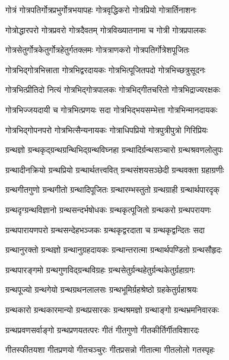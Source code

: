 \twolineshloka
{गोत्रं गोत्रपतिर्गोत्रप्रभुर्गोत्रभयापहः}%
{गोत्रवृद्धिकरो गोत्रप्रियो गोत्रार्तिनाशनः}%

\twolineshloka
{गोत्रोद्धारपरो गोत्रप्रवरो गोत्रदैवतम्}%
{गोत्रविख्यातनामा च गोत्री गोत्रप्रपालकः}%

\twolineshloka
{गोत्रसेतुर्गोत्रकेतुर्गोत्रहेतुर्गतक्लमः}%
{गोत्रत्राणकरो गोत्रपतिर्गोत्रेशपूजितः}%

\twolineshloka
{गोत्रभिद्गोत्रभित्त्राता गोत्रभिद्वरदायकः}%
{गोत्रभित्पूजितपदो गोत्रभिच्छत्रुसूदनः}%

\twolineshloka
{गोत्रभित्प्रीतिदो नित्यं गोत्रभिद्गोत्रपालकः}%
{गोत्रभिद्गीतचरितो गोत्रभिद्राज्यरक्षकः}%

\twolineshloka
{गोत्रभिज्जयदायी च गोत्रभित्प्रणयः सदा}%
{गोत्रभिद्भयसम्भेत्ता गोत्रभिन्मानदायकः}%

\twolineshloka
{गोत्रभिद्गोपनपरो गोत्रभित्सैन्यनायकः}%
{गोत्राधिपप्रियो गोत्रपुत्रीपुत्रो गिरिप्रियः}%

\twolineshloka
{ग्रन्थज्ञो ग्रन्थकृद्ग्रन्थग्रन्थिभिद्ग्रन्थविघ्नहा}%
{ग्रन्थादिर्ग्रन्थसञ्चारो ग्रन्थश्रवणलोलुपः}%

\twolineshloka
{ग्रन्थादीनक्रियो ग्रन्थप्रियो ग्रन्थार्थतत्त्ववित्}%
{ग्रन्थसंशयसञ्छेदी ग्रन्थवक्ता ग्रहाग्रणीः}%

\twolineshloka
{ग्रन्थगीतगुणो ग्रन्थगीतो ग्रन्थादिपूजितः}%
{ग्रन्थारम्भस्तुतो ग्रन्थग्राही ग्रन्थार्थपारदृक्}%

\twolineshloka
{ग्रन्थदृग्ग्रन्थविज्ञानो ग्रन्थसन्दर्भषोधकः}%
{ग्रन्थकृत्पूजितो ग्रन्थकरो ग्रन्थपरायणः}%

\twolineshloka
{ग्रन्थपारायणपरो ग्रन्थसन्देहभञ्जकः}%
{ग्रन्थकृद्वरदाता च ग्रन्थकृद्वन्दितः सदा}%

\twolineshloka
{ग्रन्थानुरक्तो ग्रन्थज्ञो ग्रन्थानुग्रहदायकः}%
{ग्रन्थान्तरात्मा ग्रन्थार्थपण्डितो ग्रन्थसौहृदः}%

\twolineshloka
{ग्रन्थपारङ्गमो ग्रन्थगुणविद्ग्रन्थविग्रहः}%
{ग्रन्थसेतुर्ग्रन्थहेतुर्ग्रन्थकेतुर्ग्रहाग्रगः}%

\twolineshloka
{ग्रन्थपूज्यो ग्रन्थगेयो ग्रन्थग्रथनलालसः}%
{ग्रन्थभूमिर्ग्रहश्रेष्ठो ग्रहकेतुर्ग्रहाश्रयः}%

\twolineshloka
{ग्रन्थकारो ग्रन्थकारमान्यो ग्रन्थप्रसारकः}%
{ग्रन्थश्रमज्ञो ग्रन्थाङ्गो ग्रन्थभ्रमनिवारकः}%

\twolineshloka
{ग्रन्थप्रवणसर्वाङ्गो ग्रन्थप्रणयतत्परः}%
{गीतं गीतगुणो गीतकीर्तिर्गीतविशारदः}%

\twolineshloka
{गीतस्फीतयशा गीतप्रणयो गीतचञ्चुरः}%
{गीतप्रसन्नो गीतात्मा गीतलोलो गतस्पृहः}%

